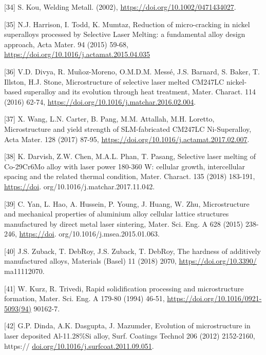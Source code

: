 \documentclass[10pt]{article}
\begin{document}
[34] S. Kou, Welding Metall. (2002), \href{https://doi.org/10.1002/0471434027}{https://doi.org/10.1002/0471434027}.

[35] N.J. Harrison, I. Todd, K. Mumtaz, Reduction of micro-cracking in nickel superalloys processed by Selective Laser Melting: a fundamental alloy design approach, Acta Mater. 94 (2015) 59-68, \href{https://doi.org/10.1016/j.actamat.2015.04.035}{https://doi.org/10.1016/j.actamat.2015.04.035}

[36] V.D. Divya, R. Muñoz-Moreno, O.M.D.M. Messé, J.S. Barnard, S. Baker, T. Illston, H.J. Stone, Microstructure of selective laser melted CM247LC nickel-based superalloy and its evolution through heat treatment, Mater. Charact. 114 (2016) 62-74, \href{https://doi.org/10.1016/j.matchar.2016.02.004}{https://doi.org/10.1016/j.matchar.2016.02.004}.

[37] X. Wang, L.N. Carter, B. Pang, M.M. Attallah, M.H. Loretto, Microstructure and yield strength of SLM-fabricated CM247LC Ni-Superalloy, Acta Mater. 128 (2017) 87-95, \href{https://doi.org/10.1016/j.actamat.2017.02.007}{https://doi.org/10.1016/j.actamat.2017.02.007}.

[38] K. Darvish, Z.W. Chen, M.A.L. Phan, T. Pasang, Selective laser melting of Co-29Cr$6 \mathrm{Mo}$ alloy with laser power 180-360 W: cellular growth, intercellular spacing and the related thermal condition, Mater. Charact. 135 (2018) 183-191, \href{https://doi}{https://doi}. org/10.1016/j.matchar.2017.11.042.

[39] C. Yan, L. Hao, A. Hussein, P. Young, J. Huang, W. Zhu, Microstructure and mechanical properties of aluminium alloy cellular lattice structures manufactured by direct metal laser sintering, Mater. Sci. Eng. A 628 (2015) 238-246, \href{https://doi}{https://doi}. org/10.1016/j.msea.2015.01.063.

[40] J.S. Zuback, T. DebRoy, J.S. Zuback, T. DebRoy, The hardness of additively manufactured alloys, Materials (Basel) 11 (2018) 2070, \href{https://doi.org/10.3390/}{https://doi.org/10.3390/} ma11112070.

[41] W. Kurz, R. Trivedi, Rapid solidification processing and microstructure formation, Mater. Sci. Eng. A 179-80 (1994) 46-51, \href{https://doi.org/10.1016/0921-5093(94)}{https://doi.org/10.1016/0921-5093(94)} 90162-7.

[42] G.P. Dinda, A.K. Dasgupta, J. Mazumder, Evolution of microstructure in laser deposited Al-11.28\%Si alloy, Surf. Coatings Technol 206 (2012) 2152-2160, https:// \href{http://doi.org/10.1016/j.surfcoat.2011.09.051}{doi.org/10.1016/j.surfcoat.2011.09.051}.
\end{document}

